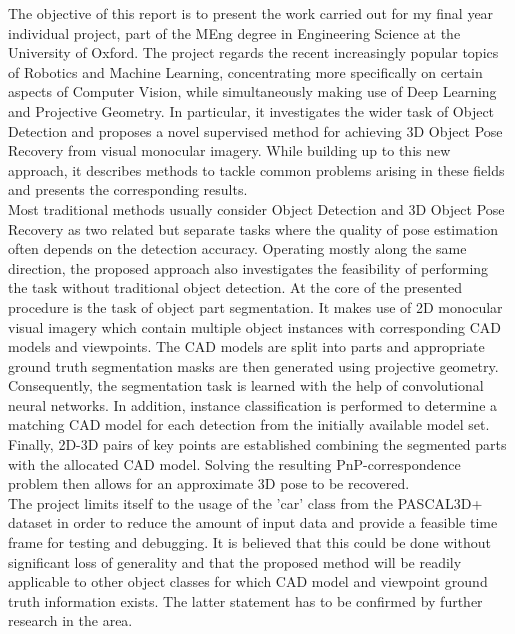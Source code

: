 \documentclass[main.tex]{subfiles}
\begin{document}
The objective of this report is to present the work carried out for my final year individual project, part of the MEng degree in Engineering Science at the University of Oxford. The project regards the recent increasingly popular topics of Robotics and Machine Learning, concentrating more specifically on certain aspects of Computer Vision, while simultaneously making use of Deep Learning and Projective Geometry. In particular, it investigates the wider task of Object Detection and proposes a novel supervised method for achieving 3D Object Pose Recovery from visual monocular imagery. While building up to this new approach, it describes methods to tackle common problems arising in these fields and presents the corresponding results. \\

Most traditional methods usually consider Object Detection and 3D Object Pose Recovery as two related but separate tasks where the quality of pose estimation often depends on the detection accuracy. Operating mostly along the same direction, the proposed approach also investigates the feasibility of performing the task without traditional object detection. At the core of the presented procedure is the task of object part segmentation. It makes use of 2D monocular visual imagery which contain multiple object instances with corresponding CAD models and viewpoints. The CAD models are split into parts and appropriate ground truth segmentation masks are then generated using projective geometry. Consequently, the segmentation task is learned with the help of convolutional neural networks. In addition, instance classification is performed to determine a matching CAD model for each detection from the initially available model set. Finally, 2D-3D pairs of key points are established combining the segmented parts with the allocated CAD model. Solving the resulting PnP-correspondence problem then allows for an approximate 3D pose to be recovered.\\

The project limits itself to the usage of the 'car' class from the PASCAL3D+ dataset in order to reduce the amount of input data and provide a feasible time frame for testing and debugging. It is believed that this could be done without significant loss of generality and that the proposed method will be readily applicable to other object classes for which CAD model and viewpoint ground truth information exists. The latter statement has to be confirmed by further research in the area.
\end{document}
